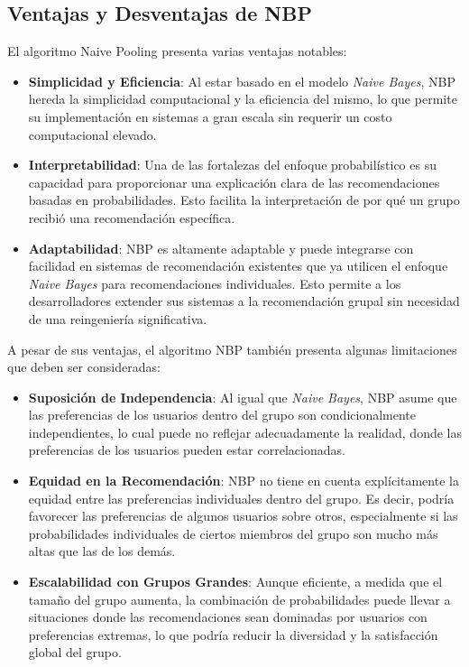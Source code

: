 \documentclass[twocolumn, fontsize=10pt]{article}
\begin{document}
\subsection{Ventajas y Desventajas de NBP}

El algoritmo Naive Pooling presenta varias ventajas notables:
\begin{itemize}
    \item \textbf{Simplicidad y Eficiencia}: 
    Al estar basado en el modelo \textit{Naive Bayes}, 
    NBP hereda la simplicidad computacional y la 
    eficiencia del mismo, lo que permite su 
    implementación en sistemas a gran escala sin 
    requerir un costo computacional elevado.
    \item \textbf{Interpretabilidad}:
    Una de las fortalezas del enfoque probabilístico 
    es su capacidad para proporcionar una explicación 
    clara de las recomendaciones basadas en 
    probabilidades. Esto facilita la interpretación de 
    por qué un grupo recibió una recomendación 
    específica.
    \item \textbf{Adaptabilidad}:
    NBP es altamente adaptable y puede integrarse con 
    facilidad en sistemas de recomendación existentes 
    que ya utilicen el enfoque \textit{Naive Bayes} 
    para recomendaciones individuales. Esto permite a 
    los desarrolladores extender sus sistemas a la 
    recomendación grupal sin necesidad de una 
    reingeniería significativa.
\end{itemize}

A pesar de sus ventajas, el algoritmo NBP también 
presenta algunas limitaciones que deben ser consideradas:

\begin{itemize}
    \item \textbf{Suposición de Independencia}:
    Al igual que \textit{Naive Bayes}, NBP asume que 
    las preferencias de los usuarios dentro del grupo 
    son condicionalmente independientes, lo cual puede 
    no reflejar adecuadamente la realidad, donde las 
    preferencias de los usuarios pueden estar 
    correlacionadas.
    \item \textbf{Equidad en la Recomendación}:
    NBP no tiene en cuenta explícitamente la equidad 
    entre las preferencias individuales dentro del 
    grupo. Es decir, podría favorecer las preferencias 
    de algunos usuarios sobre otros, especialmente si 
    las probabilidades individuales de ciertos miembros 
    del grupo son mucho más altas que las de los demás.
    \item \textbf{Escalabilidad con Grupos Grandes}:
    Aunque eficiente, a medida que el tamaño del grupo 
    aumenta, la combinación de probabilidades puede 
    llevar a situaciones donde las recomendaciones 
    sean dominadas por usuarios con preferencias 
    extremas, lo que podría reducir la diversidad y la 
    satisfacción global del grupo.
\end{itemize}
\end{document}
